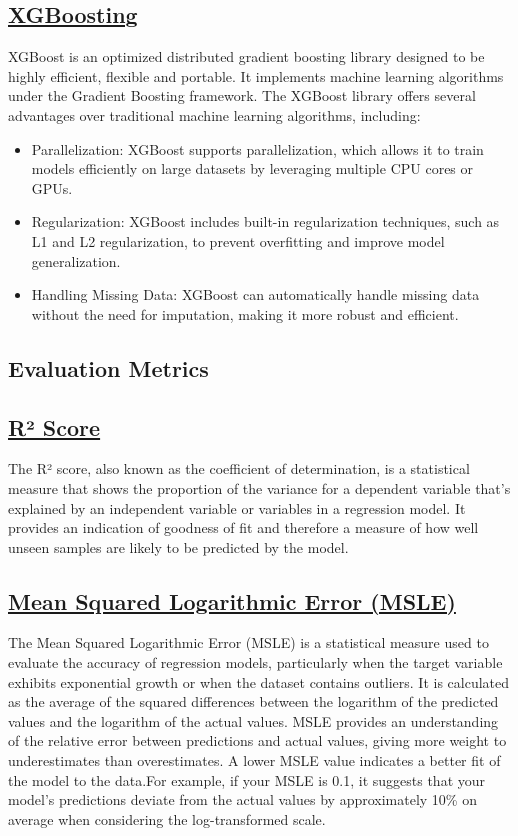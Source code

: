 \documentclass[conference]{IEEEtran}
\begin{document}
    \subsection{\href{https://en.wikipedia.org/wiki/XGBoost}{XGBoosting}}
    XGBoost is an optimized distributed gradient boosting library designed to be highly efficient, flexible and portable. It implements machine learning algorithms under the Gradient Boosting framework. The XGBoost library offers several advantages over traditional machine learning algorithms, including:
        \begin{itemize}
        \item Parallelization: XGBoost supports parallelization, which allows it to train models efficiently on large datasets by leveraging multiple CPU cores or GPUs.
        \item Regularization: XGBoost includes built-in regularization techniques, such as L1 and L2 regularization, to prevent overfitting and improve model generalization.
        \item Handling Missing Data: XGBoost can automatically handle missing data without the need for imputation, making it more robust and efficient.
        \end{itemize}

    \subsection*{Evaluation Metrics}

    \subsection*{\href{https://en.wikipedia.org/wiki/Coefficient_of_determination}{R² Score}}
        The R² score, also known as the coefficient of determination, is a statistical measure that shows the proportion of the variance for a dependent variable that's explained by an independent variable or variables in a regression model. It provides an indication of goodness of fit and therefore a measure of how well unseen samples are likely to be predicted by the model.

    \subsection*{\href{https://scikit-learn.org/stable/modules/generated/sklearn.metrics.mean_squared_log_error.html}{Mean Squared Logarithmic Error (MSLE)}}
        The Mean Squared Logarithmic Error (MSLE) is a statistical measure used to evaluate the accuracy of regression models, particularly when the target variable exhibits exponential growth or when the dataset contains outliers. It is calculated as the average of the squared differences between the logarithm of the predicted values and the logarithm of the actual values. MSLE provides an understanding of the relative error between predictions and actual values, giving more weight to underestimates than overestimates. A lower MSLE value indicates a better fit of the model to the data.For example, if your MSLE is 0.1, it suggests that your model's predictions deviate from the actual values by approximately 10\% on average when considering the log-transformed scale.
\end{document}
